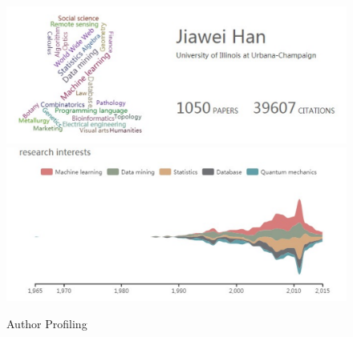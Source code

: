 \begin{figure}
\centering
\includegraphics[width=\columnwidth]{hjwAvatar.pdf}
\includegraphics[width=\columnwidth]{hjwInterest.pdf}
\caption{Author Profiling}
\label{fig:hjwProfile}
\vspace{-3ex}
\end{figure}

